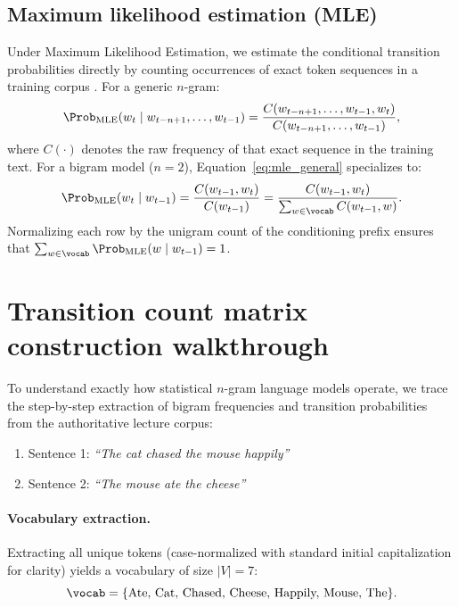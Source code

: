 \documentclass[../../main.tex]{subfiles}
\begin{document}
\subsection{Maximum likelihood estimation (MLE)}
Under Maximum Likelihood Estimation, we estimate the conditional transition probabilities directly by counting occurrences of exact token sequences in a training corpus \cite{jurafsky2024}. For a generic $n$-gram:
\begin{equation}
\label{eq:mle_general}
\Prob_{\text{MLE}}(w_t \mid w_{t-n+1}, \dots, w_{t-1}) = \frac{C(w_{t-n+1}, \dots, w_{t-1}, w_t)}{C(w_{t-n+1}, \dots, w_{t-1})},
\end{equation}
where $C(\cdot)$ denotes the raw frequency of that exact sequence in the training text. For a bigram model ($n=2$), Equation~\eqref{eq:mle_general} specializes to:
\begin{equation}
\label{eq:mle_bigram}
\Prob_{\text{MLE}}(w_t \mid w_{t-1}) = \frac{C(w_{t-1}, w_t)}{C(w_{t-1})} = \frac{C(w_{t-1}, w_t)}{\sum_{w \in \vocab} C(w_{t-1}, w)}.
\end{equation}
Normalizing each row by the unigram count of the conditioning prefix ensures that $\sum_{w \in \vocab} \Prob_{\text{MLE}}(w \mid w_{t-1}) = 1$.


\section{Transition count matrix construction walkthrough}
\label{sec:count_matrix}

To understand exactly how statistical $n$-gram language models operate, we trace the step-by-step extraction of bigram frequencies and transition probabilities from the authoritative lecture corpus:
\begin{enumerate}
    \item Sentence 1: \textit{``The cat chased the mouse happily''}
    \item Sentence 2: \textit{``The mouse ate the cheese''}
\end{enumerate}

\paragraph{Vocabulary extraction.}
Extracting all unique tokens (case-normalized with standard initial capitalization for clarity) yields a vocabulary of size $|V| = 7$:
\[
\vocab = \{\text{Ate, Cat, Chased, Cheese, Happily, Mouse, The}\}.
\]
\end{document}
